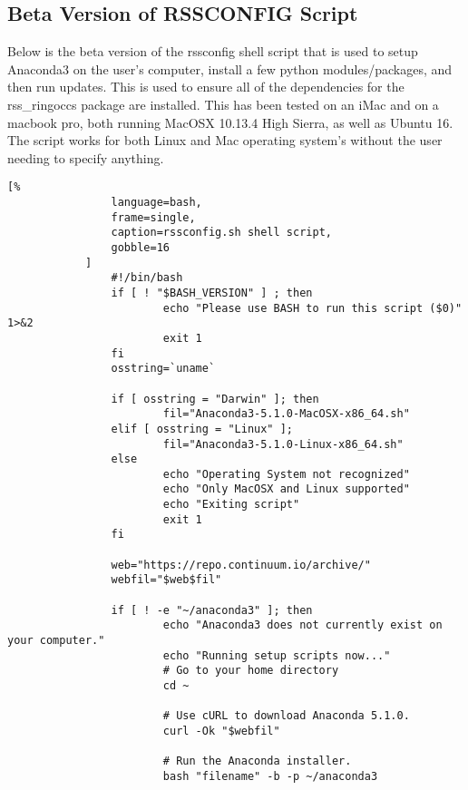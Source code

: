 \documentclass[crop=false,class=article,oneside]{standalone}
\begin{document}
        \subsection{Beta Version of RSSCONFIG Script}
            Below is the beta version of the rssconfig shell script
            that is used to setup Anaconda3 on the user's computer,
            install a few python modules/packages, and then run updates.
            This is used to ensure all of the dependencies for the
            rss\_ringoccs package are installed. This has been tested on
            an iMac and on a macbook pro, both running MacOSX 10.13.4
            High Sierra, as well as Ubuntu 16. The script works for both
            Linux and Mac operating system's without the user needing
            to specify anything.
            \begin{lstlisting}[%
                language=bash,
                frame=single,
                caption=rssconfig.sh shell script,
                gobble=16
            ]
                #!/bin/bash
                if [ ! "$BASH_VERSION" ] ; then
                        echo "Please use BASH to run this script ($0)" 1>&2
                        exit 1
                fi
                osstring=`uname`
                
                if [ osstring = "Darwin" ]; then
                        fil="Anaconda3-5.1.0-MacOSX-x86_64.sh"
                elif [ osstring = "Linux" ];
                        fil="Anaconda3-5.1.0-Linux-x86_64.sh"
                else
                        echo "Operating System not recognized"
                        echo "Only MacOSX and Linux supported"
                        echo "Exiting script"
                        exit 1
                fi
                
                web="https://repo.continuum.io/archive/"
                webfil="$web$fil"
                
                if [ ! -e "~/anaconda3" ]; then
                        echo "Anaconda3 does not currently exist on your computer."
                        echo "Running setup scripts now..."
                        # Go to your home directory
                        cd ~
                
                        # Use cURL to download Anaconda 5.1.0.
                        curl -Ok "$webfil"
                
                        # Run the Anaconda installer.
                        bash "filename" -b -p ~/anaconda3
                

\end{lstlisting}
\end{document}
